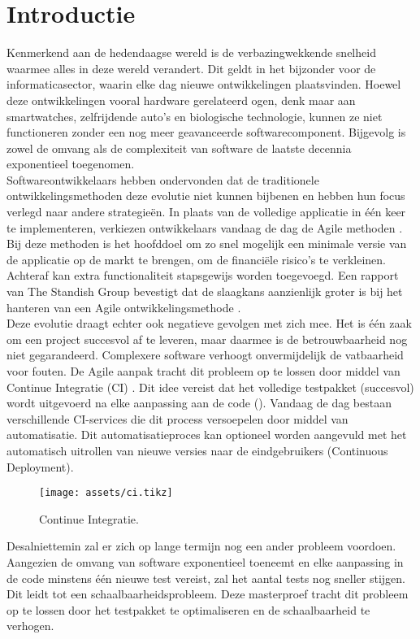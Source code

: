 
\section{Introductie}
\noindent Kenmerkend aan de hedendaagse wereld is de verbazingwekkende snelheid waarmee alles in deze wereld verandert. Dit geldt in het bijzonder voor de informaticasector, waarin elke dag nieuwe ontwikkelingen plaatsvinden. Hoewel deze ontwikkelingen vooral hardware gerelateerd ogen, denk maar aan smartwatches, zelfrijdende auto's en biologische technologie, kunnen ze niet functioneren zonder een nog meer geavanceerde softwarecomponent. Bijgevolg is zowel de omvang als de complexiteit van software de laatste decennia exponentieel toegenomen.\\

\noindent Softwareontwikkelaars hebben ondervonden dat de traditionele ontwikkelingsmethoden deze evolutie niet kunnen bijbenen en hebben hun focus verlegd naar andere strategie\"en. In plaats van de volledige applicatie in één keer te implementeren, verkiezen ontwikkelaars vandaag de dag de Agile methoden \cite{beck2001agile}. Bij deze methoden is het hoofddoel om zo snel mogelijk een minimale versie van de applicatie op de markt te brengen, om de financi\"ele risico's te verkleinen. Achteraf kan extra functionaliteit stapsgewijs worden toegevoegd. Een rapport van The Standish Group bevestigt dat de slaagkans aanzienlijk groter is bij het hanteren van een Agile ontwikkelingsmethode \cite{standish2015chaos}.\\

\noindent Deze evolutie draagt echter ook negatieve gevolgen met zich mee. Het is één zaak om een project succesvol af te leveren, maar daarmee is de betrouwbaarheid nog niet gegarandeerd. Complexere software verhoogt onvermijdelijk de vatbaarheid voor fouten. De Agile aanpak tracht dit probleem op te lossen door middel van Continue Integratie (CI) \cite{SmartJenkinsDefinitive}. Dit idee vereist dat het volledige testpakket (succesvol) wordt uitgevoerd na elke aanpassing aan de code (). Vandaag de dag bestaan verschillende CI-services die dit process versoepelen door middel van automatisatie. Dit automatisatieproces kan optioneel worden aangevuld met het automatisch uitrollen van nieuwe versies naar de eindgebruikers (Continuous Deployment).

\begin{figure}[h!]
	\centering
	\texttt{[image: assets/ci.tikz]}
	\caption{Continue Integratie.}
	\label{fig:ext-nl-ci}
\end{figure}

\noindent Desalniettemin zal er zich op lange termijn nog een ander probleem voordoen. Aangezien de omvang van software exponentieel toeneemt en elke aanpassing in de code minstens één nieuwe test vereist, zal het aantal tests nog sneller stijgen. Dit leidt tot een schaalbaarheidsprobleem. Deze masterproef tracht dit probleem op te lossen door het testpakket te optimaliseren en de schaalbaarheid te verhogen.\\